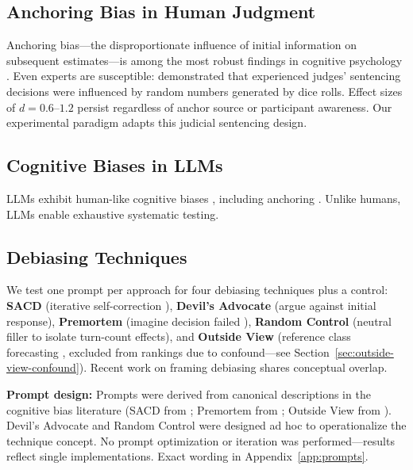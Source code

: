 \documentclass[11pt]{article}
\begin{document}
\subsection{Anchoring Bias in Human Judgment}

Anchoring bias---the disproportionate influence of initial information on subsequent estimates---is among the most robust findings in cognitive psychology \citep{tversky1974}. Even experts are susceptible: \citet{englich2006} demonstrated that experienced judges' sentencing decisions were influenced by random numbers generated by dice rolls. Effect sizes of $d = 0.6$--$1.2$ persist regardless of anchor source or participant awareness. Our experimental paradigm adapts this judicial sentencing design.

\subsection{Cognitive Biases in LLMs}

LLMs exhibit human-like cognitive biases \citep{binz2023,jones2022,chen2025cognitive}, including anchoring \citep{huang2025anchoring,song2026reasoning}. Unlike humans, LLMs enable exhaustive systematic testing.

\subsection{Debiasing Techniques}

We test one prompt per approach for four debiasing techniques plus a control: \textbf{SACD} (iterative self-correction \citep{lyu2025}), \textbf{Devil's Advocate} (argue against initial response), \textbf{Premortem} (imagine decision failed \citep{klein2007}), \textbf{Random Control} (neutral filler to isolate turn-count effects), and \textbf{Outside View} (reference class forecasting \citep{kahneman1993,sibony2019}, excluded from rankings due to confound---see Section~\ref{sec:outside-view-confound}). Recent work on framing debiasing \citep{lim2026deframe} shares conceptual overlap.

\textbf{Prompt design:} Prompts were derived from canonical descriptions in the cognitive bias literature (SACD from \citet{lyu2025}; Premortem from \citet{klein2007}; Outside View from \citet{kahneman1993}). Devil's Advocate and Random Control were designed ad hoc to operationalize the technique concept. No prompt optimization or iteration was performed---results reflect single implementations. Exact wording in Appendix~\ref{app:prompts}.
\end{document}
